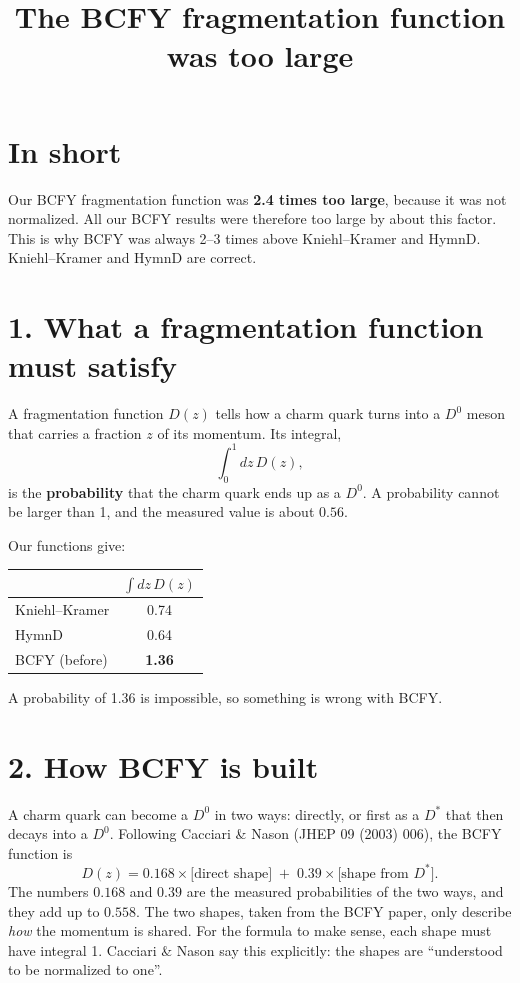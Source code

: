 \documentclass[12pt]{article}
\title{The BCFY fragmentation function was too large}
\author{}
\date{}
\begin{document}
\maketitle

\section*{In short}

Our BCFY fragmentation function was \textbf{2.4 times too large}, because it was not normalized.
All our BCFY results were therefore too large by about this factor. This is why BCFY was always
2--3 times above Kniehl--Kramer and HymnD. Kniehl--Kramer and HymnD are correct.

\section*{1. What a fragmentation function must satisfy}

A fragmentation function $D(z)$ tells how a charm quark turns into a $D^0$ meson that carries a
fraction $z$ of its momentum. Its integral,
\[
  \int_0^1 dz\,D(z),
\]
is the \textbf{probability} that the charm quark ends up as a $D^0$. A probability cannot be larger
than 1, and the measured value is about $0.56$.

Our functions give:
\begin{center}
\begin{tabular}{lc}
\toprule
 & $\int dz\,D(z)$ \\
\midrule
Kniehl--Kramer & 0.74 \\
HymnD          & 0.64 \\
BCFY (before)  & \textbf{1.36} \\
\bottomrule
\end{tabular}
\end{center}
A probability of 1.36 is impossible, so something is wrong with BCFY.

\section*{2. How BCFY is built}

A charm quark can become a $D^0$ in two ways: directly, or first as a $D^*$ that then decays into a
$D^0$. Following Cacciari \& Nason (JHEP 09 (2003) 006), the BCFY function is
\[
  D(z) = 0.168 \times \big[\text{direct shape}\big] \;+\; 0.39 \times \big[\text{shape from } D^*\big].
\]
The numbers $0.168$ and $0.39$ are the measured probabilities of the two ways, and they add up to
$0.558$. The two shapes, taken from the BCFY paper, only describe \emph{how} the momentum is shared.
For the formula to make sense, each shape must have integral 1. Cacciari \& Nason say this
explicitly: the shapes are ``understood to be normalized to one''.
\end{document}

